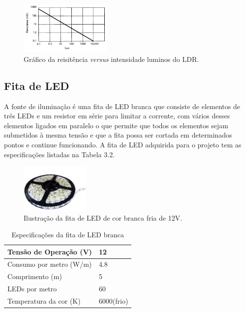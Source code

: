 \begin{figure}[htb]
    \begin{center}
    \includegraphics[width=0.4\textwidth]{figuras/reta.PNG}
    \end{center}
    \caption[Gráfico da reisitência \textit{versus} intensidade luminos do LDR.]{Gráfico da reisitência \textit{versus} intensidade luminos do LDR.}
    \label{reta}
\end{figure}

\subsection{Fita de LED}

A fonte de iluminação é uma fita de LED branca que consiste de elementos de três LEDs e um resistor em série para limitar a corrente, com vários desses elementos ligados em paralelo o que permite que todos os elementos sejam submetidos à mesma tensão e que a fita possa ser cortada em determinados pontos e continue funcionando. A fita de LED adquirida para o projeto tem as especificações listadas na Tabela 3.2.

\begin{figure}[htb]
    \begin{center}
    \includegraphics[width=0.3\textwidth]{figuras/fitaled.PNG}
    \end{center}
    \caption[Ilustração da fita de LED branca.]{Ilustração da fita de LED de cor branca fria de 12V.}
    \label{fitaled}
\end{figure}

 

\begin{table}[hbt]
    \centering
    \label{fitaled_dados}
    \caption{Especificações da fita de LED branca}
    \begin{tabular}{ll} 
        \hline
        Tensão de Operação (V)  & 12            \\ 
        \hline
        Consumo por metro (W/m) & 4.8           \\ 
        \hline
        Comprimento (m)         & 5             \\ 
        \hline
        LEDs por metro          & 60            \\ 
        \hline
        Temperatura da cor (K)  & 6000(frio)    \\
        \hline
    \end{tabular}
\end{table}

